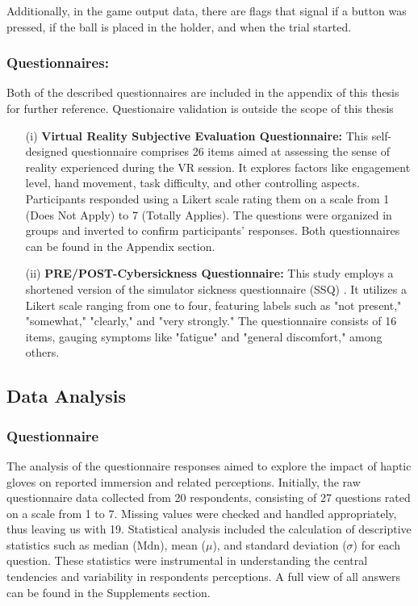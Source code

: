 \documentclass[12pt,oneside,openright]{report}
\begin{document}
Additionally, in the game output data, there are flags that signal if a button was pressed, if the ball is placed in the holder, and when the trial started.

\subsubsection*{Questionnaires:}
Both of the described questionnaires are included in the appendix of this thesis for further reference. Questionaire validation is outside the scope of this thesis

\begin{enumerate}
\item[(i)] \textbf{Virtual Reality Subjective Evaluation Questionnaire:} This self-designed questionnaire comprises 26 items aimed at assessing the sense of reality experienced during the VR session. It explores factors like engagement level, hand movement, task difficulty, and other controlling aspects. Participants responded using a Likert scale rating them on a scale from 1 (Does Not Apply) to 7 (Totally Applies). The questions were organized in groups and inverted to confirm participants' responses. Both questionnaires can be found in the Appendix section.

\item[(ii)] \textbf{PRE/POST-Cybersickness Questionnaire:} This study employs a shortened version of the simulator sickness questionnaire (SSQ) \parencite*{avpsy}. It utilizes a Likert scale ranging from one to four, featuring labels such as "not present," "somewhat," "clearly," and "very strongly." The questionnaire consists of 16 items, gauging symptoms like "fatigue" and "general discomfort," among others.
\end{enumerate}

\subsection*{Data Analysis}

\subsubsection*{Questionnaire}
The analysis of the questionnaire responses aimed to explore the impact of haptic gloves on reported immersion and related perceptions. Initially, the raw questionnaire data collected from 20 respondents, consisting of 27 questions rated on a scale from 1 to 7. Missing values were checked and handled appropriately, thus leaving us with 19. Statistical analysis included the calculation of descriptive statistics such as median ($\text{Mdn}$), mean ($\mu$), and standard deviation ($\sigma$) for each question. These statistics were instrumental in understanding the central tendencies and variability in respondents perceptions. A full view of all answers can be found in the Supplements section. 
\end{document}
